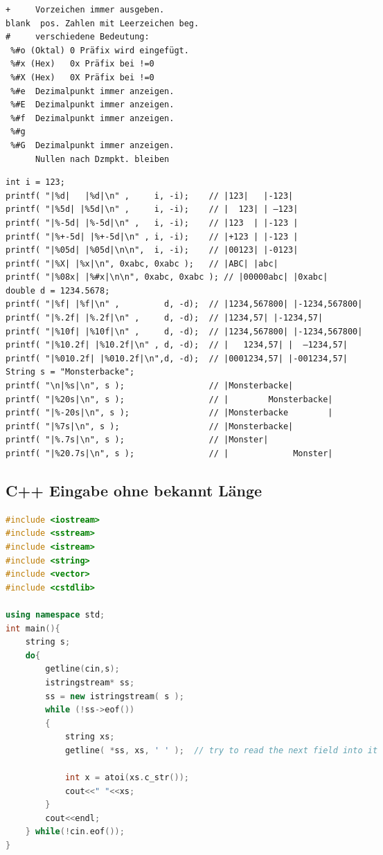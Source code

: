 \documentclass[10pt,a4paper,ngerman,oneside,]{article}
\begin{document}
\begin{multicols}{2}
\begin{verbatim}
+	  Vorzeichen immer ausgeben.
blank  pos. Zahlen mit Leerzeichen beg.
# 	  verschiedene Bedeutung:
 %#o (Oktal) 0 Präfix wird eingefügt.
 %#x (Hex)   0x Präfix bei !=0
 %#X (Hex)   0X Präfix bei !=0
 %#e  Dezimalpunkt immer anzeigen.
 %#E  Dezimalpunkt immer anzeigen.
 %#f  Dezimalpunkt immer anzeigen.
 %#g  
 %#G  Dezimalpunkt immer anzeigen. 
      Nullen nach Dzmpkt. bleiben
\end{verbatim}
\begin{verbatim}
int i = 123;
printf( "|%d|   |%d|\n" ,     i, -i);    // |123|   |-123|
printf( "|%5d| |%5d|\n" ,     i, -i);    // |  123| | –123|
printf( "|%-5d| |%-5d|\n" ,   i, -i);    // |123  | |-123 |
printf( "|%+-5d| |%+-5d|\n" , i, -i);    // |+123 | |-123 |
printf( "|%05d| |%05d|\n\n",  i, -i);    // |00123| |-0123|
printf( "|%X| |%x|\n", 0xabc, 0xabc );   // |ABC| |abc|
printf( "|%08x| |%#x|\n\n", 0xabc, 0xabc ); // |00000abc| |0xabc|
double d = 1234.5678;
printf( "|%f| |%f|\n" ,         d, -d);  // |1234,567800| |-1234,567800|
printf( "|%.2f| |%.2f|\n" ,     d, -d);  // |1234,57| |-1234,57|
printf( "|%10f| |%10f|\n" ,     d, -d);  // |1234,567800| |-1234,567800|
printf( "|%10.2f| |%10.2f|\n" , d, -d);  // |   1234,57| |  –1234,57|
printf( "|%010.2f| |%010.2f|\n",d, -d);  // |0001234,57| |-001234,57|
String s = "Monsterbacke";
printf( "\n|%s|\n", s );                 // |Monsterbacke|
printf( "|%20s|\n", s );                 // |        Monsterbacke|
printf( "|%-20s|\n", s );                // |Monsterbacke        |
printf( "|%7s|\n", s );                  // |Monsterbacke|
printf( "|%.7s|\n", s );                 // |Monster|
printf( "|%20.7s|\n", s );               // |             Monster|
\end{verbatim}
\subsection{C++ Eingabe ohne bekannt Länge}
\begin{lstlisting}[language=C++]
#include <iostream>
#include <sstream>
#include <istream>
#include <string>
#include <vector>
#include <cstdlib>

using namespace std;
int main(){
	string s;
	do{
		getline(cin,s);
		istringstream* ss;
		ss = new istringstream( s );
		while (!ss->eof())
		{
			string xs;
			getline( *ss, xs, ' ' );  // try to read the next field into it
  
			int x = atoi(xs.c_str());
			cout<<" "<<xs;
		}
		cout<<endl;	    
	} while(!cin.eof());
}
\end{lstlisting}
\end{multicols}
\end{document}
